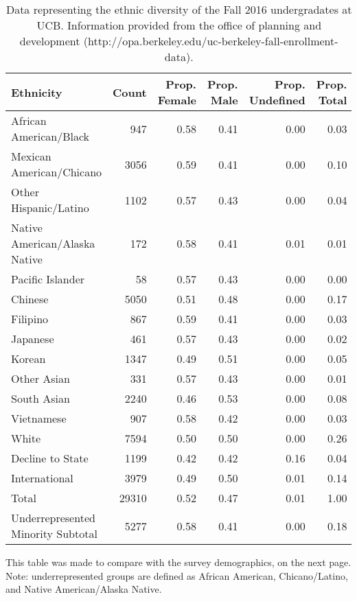 \documentclass{article}\usepackage[]{graphicx}\usepackage[]{color}
\begin{document}
\begin{table}[ht]
\centering
\begin{tabular}{lrrrrr}
  \hline
Ethnicity & Count & Prop. Female & Prop. Male & Prop. Undefined & Prop. Total \\ 
  \hline
African American/Black & 947 & 0.58 & 0.41 & 0.00 & 0.03 \\ 
  Mexican American/Chicano & 3056 & 0.59 & 0.41 & 0.00 & 0.10 \\ 
  Other Hispanic/Latino & 1102 & 0.57 & 0.43 & 0.00 & 0.04 \\ 
  Native American/Alaska Native & 172 & 0.58 & 0.41 & 0.01 & 0.01 \\ 
  Pacific Islander &  58 & 0.57 & 0.43 & 0.00 & 0.00 \\ 
  Chinese & 5050 & 0.51 & 0.48 & 0.00 & 0.17 \\ 
  Filipino & 867 & 0.59 & 0.41 & 0.00 & 0.03 \\ 
  Japanese & 461 & 0.57 & 0.43 & 0.00 & 0.02 \\ 
  Korean & 1347 & 0.49 & 0.51 & 0.00 & 0.05 \\ 
  Other Asian & 331 & 0.57 & 0.43 & 0.00 & 0.01 \\ 
  South Asian & 2240 & 0.46 & 0.53 & 0.00 & 0.08 \\ 
  Vietnamese & 907 & 0.58 & 0.42 & 0.00 & 0.03 \\ 
  White & 7594 & 0.50 & 0.50 & 0.00 & 0.26 \\ 
  Decline to State & 1199 & 0.42 & 0.42 & 0.16 & 0.04 \\ 
  International & 3979 & 0.49 & 0.50 & 0.01 & 0.14 \\ 
  Total & 29310 & 0.52 & 0.47 & 0.01 & 1.00 \\ 
  Underrepresented Minority Subtotal & 5277 & 0.58 & 0.41 & 0.00 & 0.18 \\ 
   \hline
\end{tabular}
\caption{Data representing the ethnic diversity of the Fall 2016 undergradates at UCB. Information provided from the office of planning and development  (http://opa.berkeley.edu/uc-berkeley-fall-enrollment-data).} 
\end{table}


This table was made to compare with the survey demographics, on the next page. Note: underrepresented groups are defined as African American, Chicano/Latino, and Native American/Alaska Native.

\pagebreak
\end{document}
